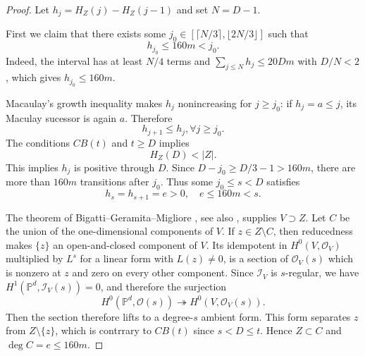 \documentclass[11pt,reqno]{amsart}
\theoremstyle{definition}
\theoremstyle{plain}
\numberwithin{equation}{section}
\begin{document}
\begin{proof}
    Let $h_j=H_Z(j)-H_Z(j-1)$ and set $N=D-1$. 
    
    First we claim that there exists some $j_0\in \left[\lceil N/3\rceil, \lfloor 2N/3\rfloor\right]$ such that
    \begin{equation*}
        h_{j_0}\le 160m<j_0.
    \end{equation*}
    Indeed, the interval has at least $N/4$ terms and $\sum_{j\le N}h_j\le 20 Dm$ with $D/N<2$, which gives $h_{j_0}\le 160m$. 

    Macaulay's growth inequality \cite[Chapter~4]{Bruns_Herzog} makes $h_j$ nonincreasing for $j\ge j_0$: if $h_j=a\le j$, its Maculay sucessor is again $a$. Therefore
    \begin{equation*}
        h_{j+1}\le h_{j}, \forall j\ge j_0.
    \end{equation*}
    The conditions $CB(t)$ and $t\ge D$ implies
    \begin{equation*}
        H_Z(D)<|Z|.
    \end{equation*}
     This implies $h_j$ is positive through $D$. Since $D-j_0\ge D/3 -1>160m$, there are more than $160m$ transitions after $j_0$. Thus some $j_0\le s<D$ satisfies
     \begin{equation*}
         h_s=h_{s+1}=e>0,\quad e\le 160m<s.
     \end{equation*}

     The theorem of Bigatti--Geramita--Migliore \cite{BGM}, see also \cite[Theorem~5.3(a)]{Migliore}, supplies $V\supset Z$. Let $C$ be the union of the one-dimensional components of $V$. If $z\in Z\setminus C$, then reducedness makes $\lbrace z\rbrace$ an open-and-closed component of $V$. Its idempotent in $H^0(V,\mathcal{O}_V)$ multiplied by $L^s$ for a linear form with $L(z)\neq 0$, is a section of $\mathcal{O}_V(s)$ which is nonzero at $z$ and zero on every other component. Since $\mathcal{I}_V$ is $s$-regular, we have $H^1(\mathbb{P}^d,\mathcal{I}_V(s))=0$, and therefore the surjection
     \begin{equation*}
         H^0(\mathbb{P}^d,\mathcal{O}(s))\twoheadrightarrow H^0(V,\mathcal{O}_V(s)).
     \end{equation*}
     Then the section therefore lifts to a degree-$s$ ambient form. This form separates $z$ from $Z\setminus \lbrace z\rbrace$, which is contrrary to $CB(t)$ since $s<D\le t$. Hence $Z\subset C$ and $\deg C=e\le 160m$.
\end{proof}
\end{document}
